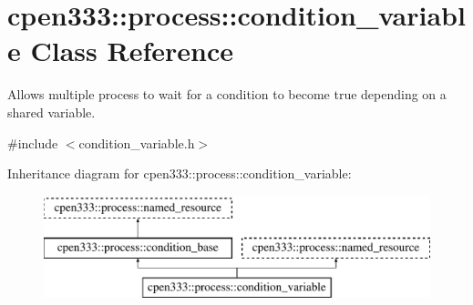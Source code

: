 \hypertarget{classcpen333_1_1process_1_1condition__variable}{}\section{cpen333\+:\+:process\+:\+:condition\+\_\+variable Class Reference}
\label{classcpen333_1_1process_1_1condition__variable}


Allows multiple process to wait for a condition to become {\ttfamily true} depending on a shared variable.  




{\ttfamily \#include $<$condition\+\_\+variable.\+h$>$}

Inheritance diagram for cpen333\+:\+:process\+:\+:condition\+\_\+variable\+:\begin{figure}[H]
\begin{center}
\leavevmode
\includegraphics[height=3.000000cm]{classcpen333_1_1process_1_1condition__variable}
\end{center}
\end{figure}
